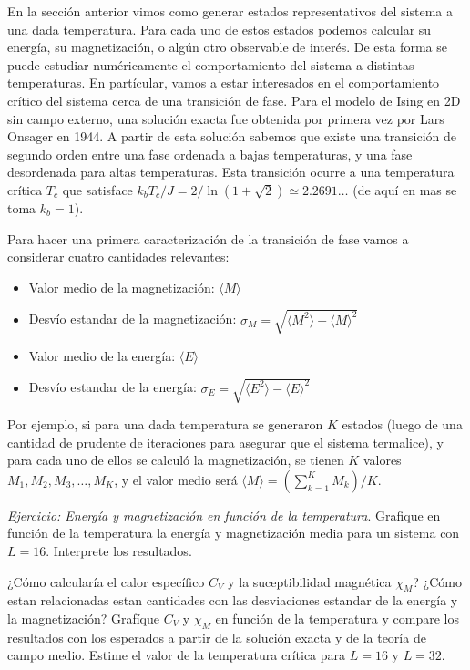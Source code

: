 \documentclass[a4paper,11pt,oneside]{article}
\newcommand{\mean}[1]{\langle #1 \rangle}
\begin{document}
En la sección anterior vimos como generar estados representativos del sistema a
una dada temperatura. Para cada uno de estos
estados podemos calcular su energía, su magnetización, o algún otro observable
de interés. De esta forma se puede estudiar numéricamente el comportamiento del
sistema a distintas temperaturas. En partícular, vamos a estar interesados en
el comportamiento crítico del sistema cerca de una transición de fase. Para el
modelo de Ising en 2D sin campo externo, 
una solución exacta fue obtenida por primera vez por
Lars Onsager en 1944. A partir de esta solución sabemos que existe una
transición de segundo orden entre una fase ordenada a bajas temperaturas,
y una fase desordenada para altas temperaturas. Esta transición ocurre a una
temperatura crítica $T_c$ que satisface $k_b T_c /J = 2/\ln(1+\sqrt{2}) \simeq
2.2691\dots$ (de aquí en mas se toma $k_b=1$).

Para hacer una primera caracterización de la transición de fase vamos a
considerar cuatro cantidades relevantes:
\begin{itemize}
    \item Valor medio de la magnetización: $\langle M \rangle$
    \item Desvío estandar de la magnetización: $\sigma_M = \sqrt{\langle
        M^2 \rangle - \langle M \rangle^2}$
    \item Valor medio de la energía: $\langle E \rangle$
    \item Desvío estandar de la energía: $\sigma_E = \sqrt{\langle
        E^2 \rangle - \langle E \rangle^2}$
\end{itemize}
Por ejemplo, si para una dada temperatura 
se generaron $K$ estados (luego de una cantidad de prudente de
iteraciones para asegurar que el sistema termalice), y para cada uno de ellos
se calculó la magnetización, se tienen $K$ valores $M_1, M_2,M_3,\dots,M_K$, y
el valor medio será $\mean{M} = (\sum_{k=1}^K M_k)/K$.

\begin{mdframed}
\emph{Ejercicio: Energía y magnetización en función de la temperatura}.
Grafique en función de la temperatura la energía y magnetización media para un
sistema con $L=16$. Interprete los resultados. 

¿Cómo calcularía el calor específico $C_V$ y la suceptibilidad magnética
$\chi_M$? ¿Cómo estan
relacionadas estan cantidades con las desviaciones estandar de la energía y la
magnetización? Grafíque $C_V$ y $\chi_M$ en función de la temperatura y compare los
resultados con los esperados a partir de la solución exacta y de la teoría de
campo medio. Estime el valor de la temperatura crítica para $L=16$ y $L=32$.
\end{mdframed}
\end{document}
